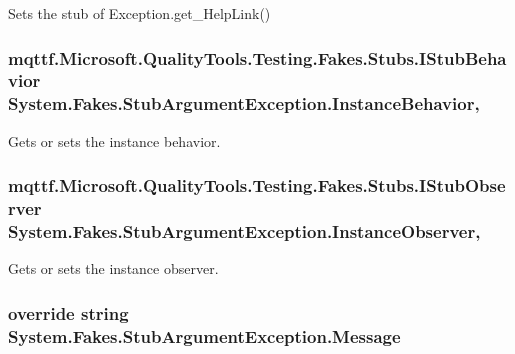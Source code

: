 Sets the stub of Exception.\-get\-\_\-\-Help\-Link()

\hypertarget{class_system_1_1_fakes_1_1_stub_argument_exception_a4fbd3754253c72f7b228cb12611fb0af}{
\subsubsection[{Instance\-Behavior}]{\setlength{\rightskip}{0pt plus 5cm}mqttf.\-Microsoft.\-Quality\-Tools.\-Testing.\-Fakes.\-Stubs.\-I\-Stub\-Behavior System.\-Fakes.\-Stub\-Argument\-Exception.\-Instance\-Behavior\hspace{0.3cm}{\ttfamily [get]}, {\ttfamily [set]}}}\label{class_system_1_1_fakes_1_1_stub_argument_exception_a4fbd3754253c72f7b228cb12611fb0af}


Gets or sets the instance behavior.

\hypertarget{class_system_1_1_fakes_1_1_stub_argument_exception_a04a4cbc7e209838dda7683127e23a8ef}{
\subsubsection[{Instance\-Observer}]{\setlength{\rightskip}{0pt plus 5cm}mqttf.\-Microsoft.\-Quality\-Tools.\-Testing.\-Fakes.\-Stubs.\-I\-Stub\-Observer System.\-Fakes.\-Stub\-Argument\-Exception.\-Instance\-Observer\hspace{0.3cm}{\ttfamily [get]}, {\ttfamily [set]}}}\label{class_system_1_1_fakes_1_1_stub_argument_exception_a04a4cbc7e209838dda7683127e23a8ef}


Gets or sets the instance observer.

\hypertarget{class_system_1_1_fakes_1_1_stub_argument_exception_a174152e4141bb8a3a4b3a52b06c981ed}{
\subsubsection[{Message}]{\setlength{\rightskip}{0pt plus 5cm}override string System.\-Fakes.\-Stub\-Argument\-Exception.\-Message\hspace{0.3cm}{\ttfamily [get]}}}\label{class_system_1_1_fakes_1_1_stub_argument_exception_a174152e4141bb8a3a4b3a52b06c981ed}


